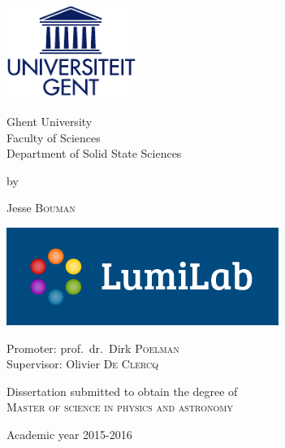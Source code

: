 \begin{titlepage}


\fontsize{12pt}{14pt}
\selectfont

\begin{center}

\includegraphics[height=3cm]{FrontBackMatter/UGent}

\vspace{0.5cm}
Ghent University \\
Faculty of Sciences\\
Department of Solid State Sciences\\

\vspace{2.0cm}

\fontsize{17.28pt}{21pt}
\selectfont

\textsc{}

\fontsize{12pt}{14pt}
\selectfont

\vspace{.6cm}

by 

\vspace{.4cm}

Jesse \textsc{Bouman}

\vspace{2.5cm}
\includegraphics[width=0.3\textwidth{}]{FrontBackMatter/logo2.png}
\vspace{1.5cm}

Promoter: prof.~dr.~Dirk \textsc{Poelman}\\
Supervisor: Olivier \textsc{De Clercq}

\vspace{1.5cm}

Dissertation submitted to obtain the degree of\\
\textsc{Master of science in physics and astronomy}

\vspace{0.75cm}

Academic year 2015-2016

\end{center}
\end{titlepage}

\thispagestyle{empty}